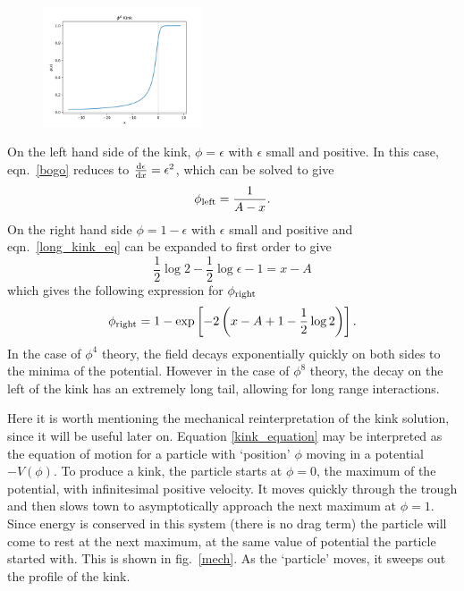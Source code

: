 \documentclass[11pt, oneside]{article}  	%
\numberwithin{equation}{section}
\newcommand{\drv}{\ensuremath{\textup{d}}}
\begin{document}
  \begin{figure}
\centering
 \includegraphics[width=0.42\textwidth]{phi8_kink.png}
  \label{phi8kink}
\end{figure}
 On the left hand side of the kink, $\phi = \epsilon$ with $\epsilon$ small and positive. In this case, eqn.~\ref{bogo} reduces to $\frac{\drv \epsilon}{\drv x} = \epsilon^2$, which can be solved to give 
 \begin{equation}
 \phi_\textup{left} = \frac{1}{A-x}.
 \end{equation}
 On the right hand side $\phi = 1- \epsilon$ with $\epsilon$ small and positive and eqn.~\ref{long_kink_eq} can be expanded to first order to give
 \begin{equation}
 \frac{1}{2} \log2 - \frac{1}{2} \log \epsilon - 1 = x-A
 \end{equation}
 which gives the following expression for $\phi_{\textup{right}}$
 \begin{equation}
 \phi_{\textup{right}} = 1- \exp\left [ -2\left ( x - A + 1 - \frac{1}{2}\log2 \right ) \right ].
 \end{equation}
 In the case of $\phi^4$ theory, the field decays exponentially quickly on both sides to the minima of the potential. However in the case of $\phi^8$ theory, the decay on the left of the kink has an extremely long tail, allowing for long range interactions.\par
 Here it is worth mentioning the mechanical reinterpretation of the kink solution, since it will be useful later on. Equation \ref{kink_equation} may be interpreted as the equation of motion for a particle with `position' $\phi$ moving in a potential $-V(\phi)$. To produce a kink, the particle starts at $\phi = 0$, the maximum of the potential, with infinitesimal positive velocity. It moves quickly through the trough and then slows town to asymptotically approach the next maximum at $\phi = 1$. Since energy is conserved in this system (there is no drag term) the particle will come to rest at the next maximum, at the same value of potential the particle started with. This is shown in fig.~\ref{mech}. As the `particle' moves, it sweeps out the profile of the kink.\par
\end{document}

